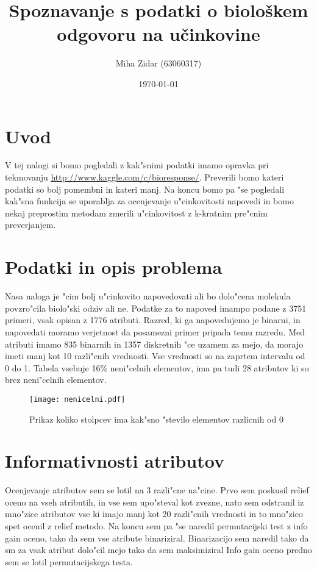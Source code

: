\documentclass[a4paper,11pt]{article}
\title{Spoznavanje s podatki o biološkem odgovoru na učinkovine}
\author{Miha Zidar (63060317)}
\date{\today}
\begin{document}
\maketitle

\section{Uvod}

V tej nalogi si bomo pogledali z kak"snimi podatki imamo opravka pri tekmovanju \url{http://www.kaggle.com/c/bioresponse/}. Preverili bomo kateri podatki so bolj pomembni in kateri manj. Na koncu bomo pa "se pogledali kak"sna funkcija se uporablja za ocenjevanje u"cinkovitosti napovedi in bomo nekaj preprostim metodam zmerili u"cinkovitost z k-kratnim pre"cnim preverjanjem.

\section{Podatki in opis problema}

Nasa naloga je "cim bolj u"cinkovito napovedovati ali bo dolo"cena molekula povzro"cila biolo"ski odziv ali ne. Podatke za to napoved imampo podane z 3751 primeri, vsak opisan z 1776 atributi. Razred, ki ga napovedujemo je binarni, in napovedati moramo verjetnost da posamezni primer pripada temu razredu. Med atributi imamo 835 binarnih in 1357 diskretnih "ce uzamem za mejo, da morajo imeti manj kot 10 razli"cnih vrednosti. Vse vrednosti so na zaprtem intervalu od 0 do 1. Tabela vsebuje 16\% neni"celnih elementov, ima pa tudi 28 atributov ki so brez neni"celnih elementov. 

\begin{figure}[htbp]
\begin{center}
\texttt{[image: nenicelni.pdf]}
\caption{Prikaz koliko stolpcev ima kak"sno "stevilo elementov razlicnih od 0}
\label{slika1}
\end{center}
\end{figure}


\section{Informativnosti atributov}

Ocenjevanje atributov sem se lotil na 3 razli"cne na"cine. Prvo sem poskusil relief oceno na vseh atributih, in vse sem upo"steval kot zvezne, nato sem odstranil iz mno"zice atributov vse ki imajo manj kot 20 razli"cnih vrednosti in to mno"zico spet ocenil z relief metodo. Na koncu sem pa "se naredil permutacijski test z info gain oceno, tako da sem vse atribute binariziral. Binarizacijo sem naredil tako da sm za vsak atribut dolo"cil mejo tako da sem maksimiziral Info gain oceno predno sem se lotil permutacijskega testa. 
\end{document}
